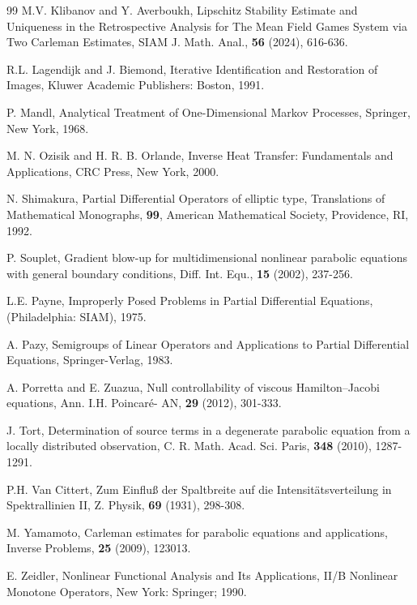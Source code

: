 \documentclass[reqno]{amsart}
\theoremstyle{plain}
\theoremstyle{remark}
\numberwithin{equation}{section}
\begin{document}
\begin{thebibliography}{99}
M.V. Klibanov and Y. Averboukh, Lipschitz Stability Estimate and Uniqueness in the Retrospective Analysis for The Mean Field Games System via Two Carleman Estimates, SIAM J. Math. Anal., {\bf 56} (2024), 616-636.

 R.L. Lagendijk and J. Biemond, Iterative Identification and Restoration of Images, Kluwer Academic Publishers: Boston, 1991.

 P. Mandl, Analytical Treatment of One-Dimensional Markov Processes, Springer, New York, 1968.

 M. N. Ozisik and H. R. B. Orlande, Inverse Heat Transfer: Fundamentals and Applications, CRC Press, New York, 2000.


N. Shimakura, Partial Differential Operators of elliptic type, Translations of Mathematical Monographs, {\bf 99}, American Mathematical Society, Providence, RI, 1992.

P. Souplet, Gradient blow-up for multidimensional nonlinear parabolic equations with general boundary conditions, 
Diff. Int. Equ., \textbf{15} (2002), 237-256. 

 L.E. Payne, Improperly Posed Problems in Partial Differential Equations, (Philadelphia: SIAM), 1975.

 A. Pazy, Semigroups of Linear Operators and Applications to Partial Differential Equations, Springer-Verlag, 1983.

 A. Porretta and E. Zuazua, Null controllability of viscous Hamilton–Jacobi equations, Ann. I.H. Poincaré- AN, \textbf{29} (2012), 301-333.

 J. Tort, Determination of source terms in a degenerate parabolic equation from a locally distributed observation, C. R. Math. Acad. Sci. Paris, \textbf{348} (2010), 1287-1291.

 P.H. Van Cittert, Zum Einfluß der Spaltbreite auf die Intensitätsverteilung in Spektrallinien II, Z. Physik, \textbf{69} (1931), 298-308.

 M. Yamamoto, Carleman estimates for parabolic equations and applications, Inverse Problems, {\bf 25} (2009), 123013.

 E. Zeidler, Nonlinear Functional Analysis and Its Applications, II/B Nonlinear Monotone Operators, New York: Springer; 1990.

\end{thebibliography}
\end{document}
